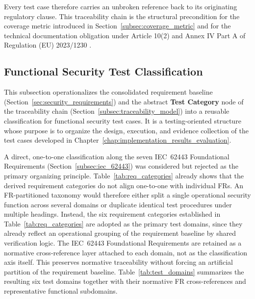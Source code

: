 Every test case therefore carries an unbroken reference back to its originating regulatory clause. This traceability chain is the structural precondition for the coverage metric introduced in Section~\ref{subsec:coverage_metric} and for the technical documentation obligation under Article 10(2) and Annex IV Part A of Regulation (EU) 2023/1230 \cite{EU2023_1230}.


\subsection{Functional Security Test Classification}
\label{subsec:test_case_taxonomy}


This subsection operationalizes the consolidated requirement baseline (Section~\ref{sec:security_requirements}) and the abstract \textbf{Test Category} node of the traceability chain (Section~\ref{subsec:traceability_model}) into a reusable classification for functional security test cases. It is a testing-oriented structure whose purpose is to organize the design, execution, and evidence collection of the test cases developed in Chapter~\ref{chap:implementation_results_evaluation}.

A direct, one-to-one classification along the seven IEC~62443 Foundational Requirements (Section~\ref{subsec:iec_62443}) was considered but rejected as the primary organizing principle. Table~\ref{tab:req_categories} already shows that the derived requirement categories do not align one-to-one with individual FRs. An FR-partitioned taxonomy would therefore either split a single operational security function across several domains or duplicate identical test procedures under multiple headings. 
Instead, the six requirement categories established in Table~\ref{tab:req_categories} are adopted as the primary test domains, since they already reflect an operational grouping of the requirement baseline by shared verification logic. The IEC~62443 Foundational Requirements are retained as a normative cross-reference layer attached to each domain, not as the classification axis itself. This preserves normative traceability without forcing an artificial partition of the requirement baseline. Table~\ref{tab:test_domains} summarizes the resulting six test domains together with their normative FR cross-references and representative functional subdomains.

